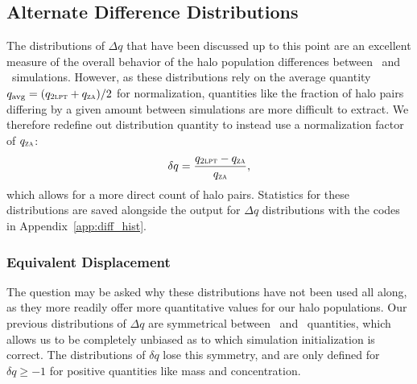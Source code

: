 \subsection{Alternate Difference Distributions}
\label{subsec:analysis--alt_diff_dist}


The distributions of $\Delta q$ that have been discussed up to this point are an excellent measure of the overall behavior of the halo population differences between \lpt\ and \za\ simulations.  However, as these distributions rely on the average quantity $q_{\mathrm{avg}} = (q_{\textsc{2lpt}} + q_{\textsc{za}}) / 2$ for normalization, quantities like the fraction of halo pairs differing by a given amount between simulations are more difficult to extract.  We therefore redefine out distribution quantity to instead use a normalization factor of $q_{\textsc{za}}$:
\begin{equation} \label{eq:methods--analysis--delta_prime_q}
	\delta q = \frac{q_{\textsc{2lpt}} - q_{\textsc{za}}}{q_{\textsc{za}}},
\end{equation}
which allows for a more direct count of halo pairs.  Statistics for these distributions are saved alongside the output for $\Delta q$ distributions with the codes in Appendix~\ref{app:diff_hist}.



\subsubsection{Equivalent Displacement}
\label{subsubsec:analysis--alt_diff_dist--equiv_displacment}


The question may be asked why these distributions have not been used all along, as they more readily offer more quantitative values for our halo populations.  Our previous distributions of $\Delta q$ are symmetrical between \lpt\ and \za\ quantities, which allows us to be completely unbiased as to which simulation initialization is correct.  The distributions of $\delta q$ lose this symmetry, and are only defined for $\delta q \geq -1$ for positive quantities like mass and concentration.

